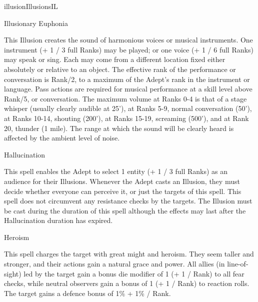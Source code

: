 \begin{college}[1.4]{illusion}{Illusions}{IL}
\begin{spell}[S-6]{Illusionary Euphonia}

\begin{effects}
This Illusion creates the sound of harmonious voices or musical
instruments. One instrument (+ 1 / 3 full Ranks) may be played; or one
voice (+ 1 / 6 full Ranks) may speak or sing. Each may come from a
different location fixed either absolutely or relative to an
object. The effective rank of the performance or conversation is
Rank/2, to a maximum of the Adept's rank in the instrument or
language. Pass actions are required for musical performance at a skill
level above Rank/5, or conversation. The maximum volume at Ranks 0-4
is that of a stage whisper (usually clearly audible at 25'), at Ranks
5-9, normal conversation (50'), at Ranks 10-14, shouting (200'), at
Ranks 15-19, screaming (500'), and at Rank 20, thunder (1 mile). The
range at which the sound will be clearly heard is affected by the
ambient level of noise.
\end{effects}
\end{spell}

\begin{spell}[S-7]{Hallucination}

\begin{effects}
This spell enables the Adept to select 1 entity (+ 1 / 3 full Ranks)
as an audience for their Illusions. Whenever the Adept casts an
Illusion, they must decide whether everyone can perceive it, or just
the targets of this spell. This spell does not circumvent any
resistance checks by the targets. The Illusion must be cast during the
duration of this spell although the effects may last after the
Hallucination duration has expired.
\end{effects}
\end{spell}

\begin{spell}[S-8]{Heroism}

\begin{effects}
This spell charges the target with great might and heroism. They seem
taller and stronger, and their actions gain a natural grace and power.
All allies (in line-of-sight) led by the target gain a bonus die
modifier of 1 (+ 1 / Rank) to all fear checks, while neutral observers
gain a bonus of 1 (+ 1 / Rank) to reaction rolls.  The target gains a
defence bonus of 1\% + 1\% / Rank.
\end{effects}
\end{spell}


\end{college}
